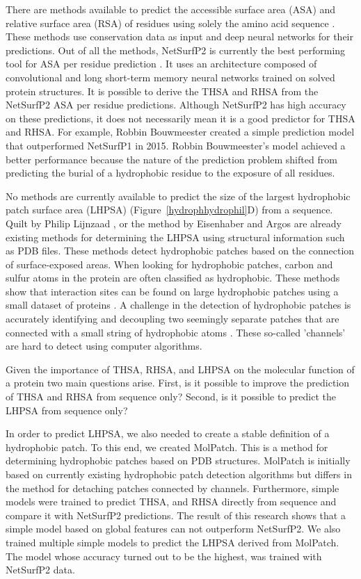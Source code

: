 \documentclass[11pt,a4paper]{article}
\begin{document}
There are methods available to predict the accessible surface area (ASA) and relative surface area (RSA) of residues using solely the amino acid sequence \cite{klausen2019netsurfp, hanson2019improving, kallberg2014raptorx}. These methods use conservation data as input and deep neural networks for their predictions. Out of all the methods, NetSurfP2 is currently the best performing tool for ASA per residue prediction \cite{klausen2019netsurfp}. It uses an architecture composed of convolutional and long short-term memory neural networks trained on solved protein structures. It is possible to derive the THSA and RHSA from the  NetSurfP2 ASA per residue predictions. Although NetSurfP2 has high accuracy on these predictions, it does not necessarily mean it is a good predictor for THSA and RHSA. For example, Robbin Bouwmeester created a simple prediction model that outperformed NetSurfP1 \cite{petersen2009generic} in 2015.  Robbin Bouwmeester's model achieved a better performance because the nature of the prediction problem shifted from predicting the burial of a hydrophobic residue to the exposure of all residues.

No methods are currently available to predict the size of the largest hydrophobic patch surface area (LHPSA) (Figure~\ref{hydrophhydrophil}D) from a sequence. Quilt by Philip Lijnzaad \cite{lijnzaad1996method}, or the method by Eisenhaber and Argos \cite{eisenhaber1996hydrophobic} are already existing methods for determining the LHPSA using structural information such as PDB files. These methods detect hydrophobic patches based on the connection of surface-exposed areas. When looking for hydrophobic patches, carbon and sulfur atoms in the protein are often classified as hydrophobic. These methods show that interaction sites can be found on large hydrophobic patches using a small dataset of proteins \cite{lijnzaad1997hydrophobic}. A challenge in the detection of hydrophobic patches is accurately identifying and decoupling two seemingly separate patches that are connected with a small string of hydrophobic atoms \cite{lijnzaad1996method}. These so-called 'channels' are hard to detect using computer algorithms.

Given the importance of THSA, RHSA, and LHPSA on the molecular function of a protein two main questions arise. First, is it possible to improve the prediction of THSA and RHSA from sequence only? Second, is it possible to predict the LHPSA from sequence only?

 In order to  predict LHPSA, we also needed to create a stable definition of a hydrophobic patch. To this end, we created MolPatch. This is a method for determining hydrophobic patches based on PDB structures. MolPatch is initially based on currently existing hydrophobic patch detection algorithms but differs in the method for detaching patches connected by channels. Furthermore, simple models were trained to predict THSA, and RHSA directly from sequence and compare it with NetSurfP2 predictions. The result of this research shows that a simple model based on global features can not outperform NetSurfP2. We also trained multiple simple models to predict the LHPSA derived from MolPatch. The model whose accuracy turned out to be the highest, was trained with NetSurfP2 data.
\end{document}
